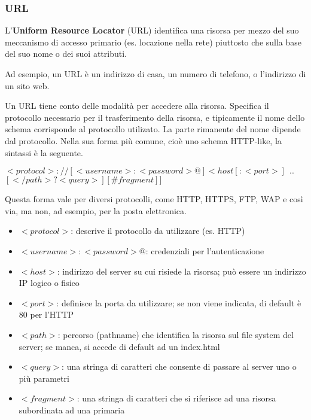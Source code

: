 \subsubsection{URL}
    
L'\textbf{Uniform Resource Locator} (URL) identifica una risorsa per mezzo del suo meccanismo di accesso primario (es. locazione nella rete) piuttosto che sulla base del suo nome o dei suoi attributi.

Ad esempio, un URL è un indirizzo di casa, un numero di telefono, o l'indirizzo di un sito web.

\vspace{3mm}

Un URL tiene conto delle modalità per accedere alla risorsa. Specifica il protocollo necessario per il trasferimento della risorsa, e tipicamente il nome dello schema corrisponde al protocollo utilizato. La parte rimanente del nome dipende dal protocollo. Nella sua forma più comune, cioè uno schema HTTP-like, la sintassi è la seguente.

\begin{center}
\(<protocol>://[<username>:<password>@]<host[:<port>]\ \ ..\)
\([</path>?<query>][\#fragment]]\)
\end{center}

Questa forma vale per diversi protocolli, come HTTP, HTTPS, FTP, WAP e così via, ma non, ad esempio, per la posta elettronica.

\begin{itemize}
    \item 
    \(<protocol>\): descrive il protocollo da utilizzare (es. HTTP)
    \item
    \(<username>:<password>@\): credenziali per l'autenticazione
    \item
    \(<host>\): indirizzo del server su cui risiede la risorsa; può essere un indirizzo IP logico o fisico
    \item
    \(<port>\): definisce la porta da utilizzare; se non viene indicata, di default è 80 per l'HTTP
    \item
    \(<path>\): percorso (pathname) che identifica la risorsa sul file system del server; se manca, si accede di default ad un index.html
    \item
    \(<query>\): una stringa di caratteri che consente di passare al server uno o più parametri
    \item
    \(<fragment>\): una stringa di caratteri che si riferisce ad una risorsa subordinata ad una primaria
\end{itemize}

